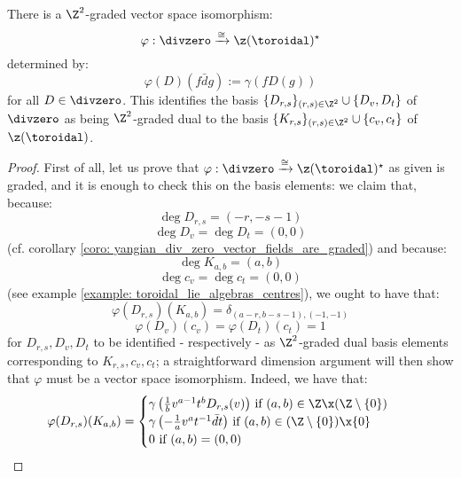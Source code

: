         \begin{proposition} \label{prop: yangian_div_zero_vector_fields_are_graded_dual_to_toroidal_centre}
            There is a $\Z^2$-graded vector space isomorphism:
                $$\varphi: \divzero \xrightarrow[]{\cong} \z(\toroidal)^{\star}$$
            determined by:
                $$\varphi(D)( f\bar{d}g ) := \gamma( f D(g) )$$
            for all $D \in \divzero$. This identifies the basis $\{D_{r, s}\}_{(r, s) \in \Z^2} \cup \{D_v, D_t\}$ of $\divzero$ as being $\Z^2$-graded dual to the basis $\{K_{r, s}\}_{(r, s) \in \Z^2} \cup \{c_v, c_t\}$ of $\z(\toroidal)$.
        \end{proposition}
            \begin{proof}
                First of all, let us prove that $\varphi: \divzero \xrightarrow[]{\cong} \z(\toroidal)^{\star}$ as given is graded, and it is enough to check this on the basis elements: we claim that, because:
                    $$\deg D_{r, s} = (-r, -s - 1)$$
                    $$\deg D_v = \deg D_t = (0, 0)$$
                (cf. corollary \ref{coro: yangian_div_zero_vector_fields_are_graded}) and because:
                    $$\deg K_{a, b} = (a, b)$$
                    $$\deg c_v = \deg c_t = (0, 0)$$
                (see example \ref{example: toroidal_lie_algebras_centres}), we ought to have that:
                    $$\varphi(D_{r, s})(K_{a, b}) = \delta_{(a - r, b - s - 1), (-1, -1)}$$
                    $$\varphi(D_v)(c_v) = \varphi(D_t)(c_t) = 1$$
                for $D_{r, s}, D_v, D_t$ to be identified - respectively - as $\Z^2$-graded dual basis elements corresponding to $K_{r, s}, c_v, c_t$; a straightforward dimension argument will then show that $\varphi$ must be a vector space isomorphism. Indeed, we have that:
                    $$
                        \begin{aligned}
                            \varphi(D_{r, s})(K_{a, b}) & = 
                            \begin{cases}
                                \text{$\gamma\left( \frac1b v^{a - 1} t^b D_{r, s}(v) \right)$ if $(a, b) \in \Z \x (\Z \setminus \{0\})$}
                                \\
                                \text{$\gamma\left( -\frac1a v^a t^{-1} \bar{d}t \right)$ if $(a, b) \in (\Z \setminus \{0\}) \x \{0\}$}
                                \\
                                \text{$0$ if $(a, b) = (0, 0)$}

\end{cases}
\end{aligned}$$
\end{proof}
